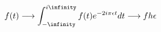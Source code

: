 \documentclass[preview]{standalone}
\begin{document}
\begin{align*}
f(t) \longrightarrow   \int^{i \infinity}_{- \infinity} f(t) e^{-2 i \pi \epsilon t}dt   \longrightarrow f^^(\epsilon
\end{align*}
\end{document}
